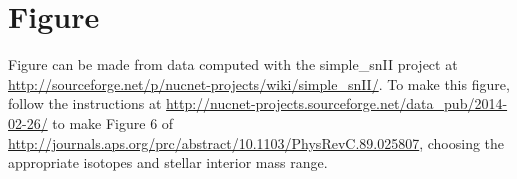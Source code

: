 \section*{Figure }
\hypertarget{sec:stellar}{}


\noindent Figure  can be made from data computed with
the simple\_snII project at
\url{http://sourceforge.net/p/nucnet-projects/wiki/simple_snII/}.
To make this figure, follow the instructions at
\url{http://nucnet-projects.sourceforge.net/data_pub/2014-02-26/}
to make Figure 6 of
\url{http://journals.aps.org/prc/abstract/10.1103/PhysRevC.89.025807},
choosing the appropriate isotopes and stellar interior mass range.

\addtocounter{counter}{1}

